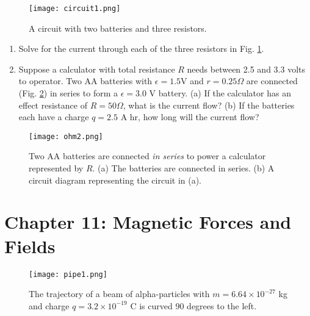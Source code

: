\documentclass[10pt]{article}
\begin{document}
\begin{figure}[ht]
\centering
\texttt{[image: circuit1.png]}
\caption{\label{fig:circuit1} A circuit with two batteries and three resistors.}
\end{figure}

\begin{enumerate}
\item Solve for the current through each of the three resistors in Fig. \ref{fig:circuit1}. \\ \vspace{4cm}
\item Suppose a calculator with total resistance $R$ needs between 2.5 and 3.3 volts to operator.  Two AA batteries with $\epsilon = 1.5$V and $r = 0.25\Omega$ are connected (Fig. \ref{fig:ohm2}) in series to form a $\epsilon = 3.0$ V battery.  (a) If the calculator has an effect resistance of $R = 50\Omega$, what is the current flow? (b) If the batteries each have a charge $q = 2.5$ A hr, how long will the current flow? \\ \vspace{3cm}
\end{enumerate}

\begin{figure}[hb]
\centering
\texttt{[image: ohm2.png]}
\caption{\label{fig:ohm2} Two AA batteries are connected \textit{in series} to power a calculator represented by $R$.  (a) The batteries are connected in series.  (b) A circuit diagram representing the circuit in (a).}
\end{figure}

\clearpage

\section{Chapter 11: Magnetic Forces and Fields}

\begin{figure}[ht]
\centering
\texttt{[image: pipe1.png]}
\caption{\label{fig:pipe1} The trajectory of a beam of alpha-particles with $m = 6.64 \times 10^{-27}$ kg and charge $q = 3.2 \times 10^{-19}$ C is curved 90 degrees to the left.}
\end{figure}
\end{document}
